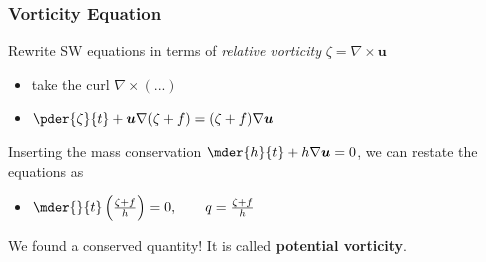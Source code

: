 \documentclass[12pt]{beamer}
\begin{document}
%
%
%
%
\begin{frame}
\frametitle{Vorticity Equation}
Rewrite SW equations in terms of \textit{relative vorticity} $\zeta=\nabla\times\bm{u}$
\vspace{0.2cm}
\begin{itemize}
	\item take the curl $\nabla \times \left(...\right)$
	\item $\pder{\zeta}{t}+\bm{u}\nabla(\zeta+f)=(\zeta+f)\nabla \bm{u}$
\end{itemize}
\vspace{0.5cm}
Inserting the mass conservation $\mder{h}{t}+h\nabla\bm{u}=0$, we can restate the equations as 
\vspace{0.5cm}
\begin{itemize}
	\item $\mder{}{t}\left(\frac{\zeta+f}{h}\right)=0,\qquad q=\frac{\zeta+f}{h}$
\end{itemize}
\vspace{0.5cm}
We found a conserved quantity! It is called \textbf{potential vorticity}. 
\end{frame}
\end{document}
